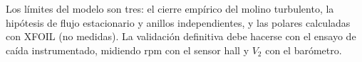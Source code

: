 Los límites del modelo son tres: el cierre empírico del molino turbulento, la hipótesis
de flujo estacionario y anillos independientes, y las polares calculadas con XFOIL (no
medidas). La validación definitiva debe hacerse con el ensayo de caída instrumentado,
midiendo rpm con el sensor hall y $V_2$ con el barómetro.

